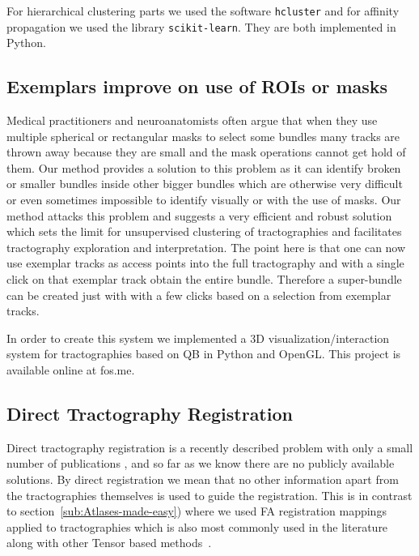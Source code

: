 \documentclass[preprint,authoryear,a4paper,10pt,onecolumn]{elsarticle}
\begin{document}
For hierarchical clustering parts we used the software \texttt{hcluster}
and for affinity propagation we used the library
\texttt{scikit-learn}. They are both implemented in Python.

\subsection{Exemplars improve on use of ROIs or masks}

Medical practitioners and neuroanatomists often argue that when they use
multiple spherical or rectangular masks to select some bundles many
tracks are thrown away because they are small and the mask operations
cannot get hold of them. Our method provides a solution to this problem
as it can identify broken or smaller bundles inside other bigger bundles
which are otherwise very difficult or even sometimes impossible to
identify visually or with the use of masks. Our method attacks this
problem and suggests a very efficient and robust solution which sets the
limit for unsupervised clustering of tractographies and facilitates
tractography exploration and interpretation. The point here is that one
can now use exemplar tracks as access points into the full tractography
and with a single click on that exemplar track obtain the entire bundle.
Therefore a super-bundle can be created just with with a few clicks
based on a selection from exemplar tracks.

In order to create this system we implemented a 3D
visualization/interaction system for tractographies based on QB in
Python and OpenGL. This project is available online at fos.me.


\subsection{Direct Tractography Registration}

Direct tractography registration is a recently described problem with
only a small number of publications \citep{leemans2006multiscale,
  mayer2008bundles, mayerdirect, mayer2011supervised,
  durrleman2010registration, zvitia2008adaptive, Zvitia2010,
  ZiyanMICCAI07}, and so far as we know there are no publicly available
solutions. By direct registration we mean that no other information
apart from the tractographies themselves is used to guide the
registration. This is in contrast to
section~\ref{sub:Atlases-made-easy}) where we used FA registration
mappings applied to tractographies which is also most commonly used in
the literature along with other Tensor based
methods~\citep{goh2006algebraic}.
\end{document}
